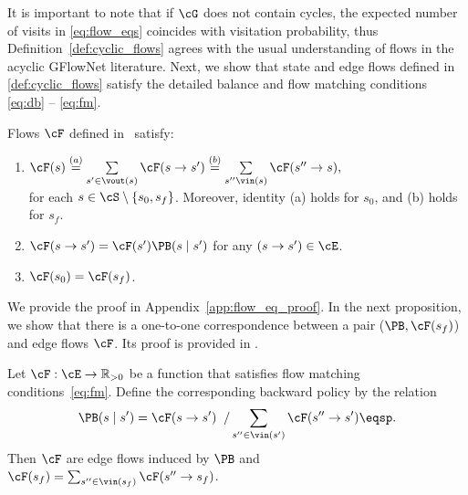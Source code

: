 It is important to note that if $\cG$ does not contain cycles, the expected number of visits in \eqref{eq:flow_eqs} coincides with visitation probability, thus Definition~\ref{def:cyclic_flows} agrees with the usual understanding of flows in the acyclic GFlowNet literature. Next, we show that state and edge flows defined in \eqref{def:cyclic_flows} satisfy the detailed balance and flow matching conditions \eqref{eq:db} --  \eqref{eq:fm}.

\begin{proposition}
\label{th:flow_eqs}
Flows $\cF$ defined in~ satisfy:
\begin{enumerate}%
    \item $\cF(s) \overset{(a)}{=} \sum\limits_{s' \in \vout(s)} \cF(s \to s') \overset{(b)}{=} \sum\limits_{s'' \vin(s)} \cF(s'' \to s),$ \\
    for each $s \in \cS \setminus \{s_0, s_f\}$. Moreover, identity (a) holds for $s_0$, and (b) holds for $s_f$. 
    \item $\cF(s \to s') = \cF(s')\PB(s \mid s')$ for any $(s \to s') \in \cE$.
    \item $\cF(s_0) = \cF(s_f)$.
\end{enumerate}
\end{proposition}

We provide the proof in Appendix~\ref{app:flow_eq_proof}. In the next proposition, we show that there is a one-to-one correspondence between a pair ($\PB, \cF(s_f)$) and edge flows $\cF$. Its proof is provided in .
\begin{proposition}
\label{th:pb_from_flow}
Let $\cF : \cE \to \mathbb{R}_{>0}$ be a function that satisfies flow matching conditions~\eqref{eq:fm}. Define the corresponding backward policy by the relation
\begin{equation*}
\PB(s \mid s') = \cF(s \to s') \;\; / \sum_{s'' \in \vin(s')} \cF(s'' \to s')\eqsp.
\end{equation*}
Then $\cF$ are edge flows induced by $\PB$ and $\cF(s_f) =  \sum_{s'' \in \vin(s_f)} \cF(s'' \to s_f)$.
\end{proposition}


